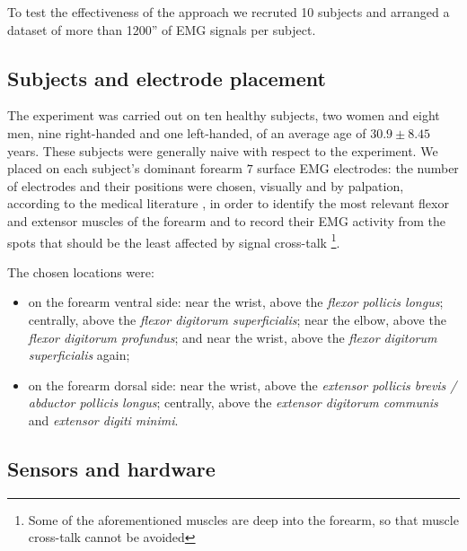 To test the effectiveness of the approach we recruted 10 subjects and arranged a dataset of more than 1200'' of EMG signals per subject.

\subsection{Subjects and electrode placement}

The experiment was carried out on ten healthy subjects, two women and eight men, nine right-handed and one left-handed, of an average age of $30.9 \pm 8.45$ years. These subjects were generally naive with respect to the experiment.
We placed on each subject's dominant forearm $7$ surface EMG electrodes: the number of electrodes and their positions were chosen, visually and by palpation, according to the medical literature \cite{Kendall}, in order to identify the most relevant flexor and extensor muscles of the forearm and to record their EMG activity from the spots that should be the least affected by signal cross-talk \footnote{Some of the aforementioned muscles are deep into the forearm, so that muscle cross-talk cannot be avoided}.

The chosen locations were:
\begin{itemize}

  \item on the forearm ventral side: near the wrist, above the 
    \emph{flexor pollicis longus}; centrally, above the \emph{flexor
    digitorum superficialis}; near the elbow, above the \emph{flexor
    digitorum profundus}; and near the wrist, above the \emph{flexor
    digitorum superficialis} again;

  \item on the forearm dorsal side: near the wrist, above the
    \emph{extensor pollicis brevis / abductor pollicis longus};
    centrally, above the \emph{extensor digitorum communis} and
    \emph{extensor digiti minimi}.

\end{itemize}

\subsection{Sensors and hardware}


